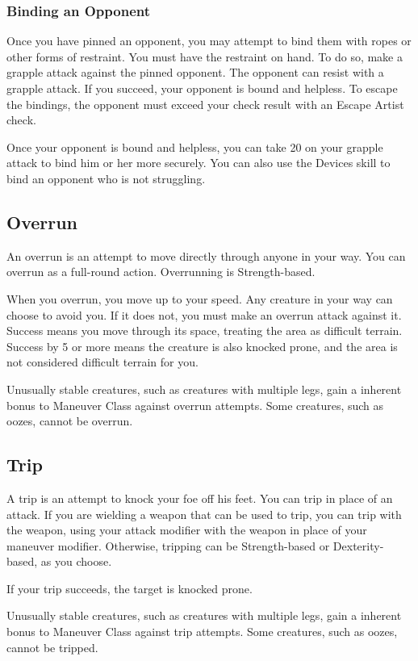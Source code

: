 \subsubsection{Binding an Opponent}
Once you have pinned an opponent, you may attempt to bind them with ropes or other forms of restraint. You must have the restraint on hand. To do so, make a grapple attack against the pinned opponent. The opponent can resist with a grapple attack. If you succeed, your opponent is bound and helpless. To escape the bindings, the opponent must exceed your check result with an Escape Artist check.

Once your opponent is bound and helpless, you can take 20 on your grapple attack to bind him or her more securely. You can also use the Devices skill to bind an opponent who is not struggling.

\subsection{Overrun}\label{Overrun}
An overrun is an attempt to move directly through anyone in your way. You can overrun as a full-round action. Overrunning is Strength-based.

When you overrun, you move up to your speed. Any creature in your way can choose to avoid you. If it does not, you must make an overrun attack against it. Success means you move through its space, treating the area as difficult terrain. Success by 5 or more means the creature is also knocked prone, and the area is not considered difficult terrain for you.

Unusually stable creatures, such as creatures with multiple legs, gain a  inherent bonus to Maneuver Class against overrun attempts. Some creatures, such as oozes, cannot be overrun.

\subsection{Trip}\label{Trip}
A trip is an attempt to knock your foe off his feet. You can trip in place of an attack. If you are wielding a weapon that can be used to trip, you can trip with the weapon, using your attack modifier with the weapon in place of your maneuver modifier. Otherwise, tripping can be Strength-based or Dexterity-based, as you choose.

If your trip succeeds, the target is knocked prone.

Unusually stable creatures, such as creatures with multiple legs, gain a  inherent bonus to Maneuver Class against trip attempts. Some creatures, such as oozes, cannot be tripped.

